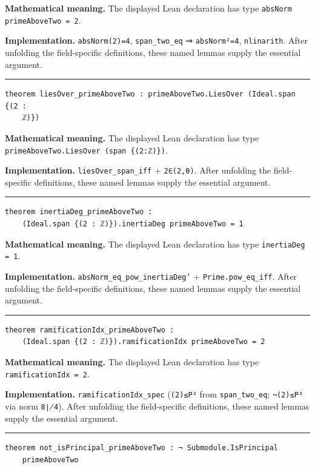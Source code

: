 \documentclass[UTF8,a4paper,11pt,fontset=fandol]{ctexart}
\theoremstyle{definition}
\newcommand{\statementsep}{\par\medskip\hrule\medskip}
\begin{document}
\noindent\textbf{Mathematical meaning.} The displayed Lean declaration has type \texttt{absNorm primeAboveTwo = 2}.\par
\noindent\textbf{Implementation.} \texttt{absNorm(2)=4}, \texttt{span\_\allowbreak{}two\_\allowbreak{}eq} ⇒ \texttt{absNorm²=4}, \texttt{nlinarith}. After unfolding the field-specific definitions, these named lemmas supply the essential argument.\par
\statementsep
\begin{verbatim}
theorem liesOver_primeAboveTwo : primeAboveTwo.LiesOver (Ideal.span {(2 :
    ℤ)})
\end{verbatim}
\noindent\textbf{Mathematical meaning.} The displayed Lean declaration has type \texttt{primeAboveTwo.\allowbreak{}LiesOver (span \{(2:ℤ)\})}.\par
\noindent\textbf{Implementation.} \texttt{liesOver\_\allowbreak{}span\_\allowbreak{}iff} + \texttt{2∈(2,θ)}. After unfolding the field-specific definitions, these named lemmas supply the essential argument.\par
\statementsep
\begin{verbatim}
theorem inertiaDeg_primeAboveTwo :
    (Ideal.span {(2 : ℤ)}).inertiaDeg primeAboveTwo = 1
\end{verbatim}
\noindent\textbf{Mathematical meaning.} The displayed Lean declaration has type \texttt{inertiaDeg = 1}.\par
\noindent\textbf{Implementation.} \texttt{absNorm\_\allowbreak{}eq\_\allowbreak{}pow\_\allowbreak{}inertiaDeg'} + \texttt{Prime.\allowbreak{}pow\_\allowbreak{}eq\_\allowbreak{}iff}. After unfolding the field-specific definitions, these named lemmas supply the essential argument.\par
\statementsep
\begin{verbatim}
theorem ramificationIdx_primeAboveTwo :
    (Ideal.span {(2 : ℤ)}).ramificationIdx primeAboveTwo = 2
\end{verbatim}
\noindent\textbf{Mathematical meaning.} The displayed Lean declaration has type \texttt{ramificationIdx = 2}.\par
\noindent\textbf{Implementation.} \texttt{ramificationIdx\_\allowbreak{}spec} (\texttt{(2)≤P²} from \texttt{span\_\allowbreak{}two\_\allowbreak{}eq}; \texttt{¬(2)≤P³} via norm \texttt{8∤4}). After unfolding the field-specific definitions, these named lemmas supply the essential argument.\par
\statementsep
\begin{verbatim}
theorem not_isPrincipal_primeAboveTwo : ¬ Submodule.IsPrincipal
    primeAboveTwo
\end{verbatim}
\end{document}
